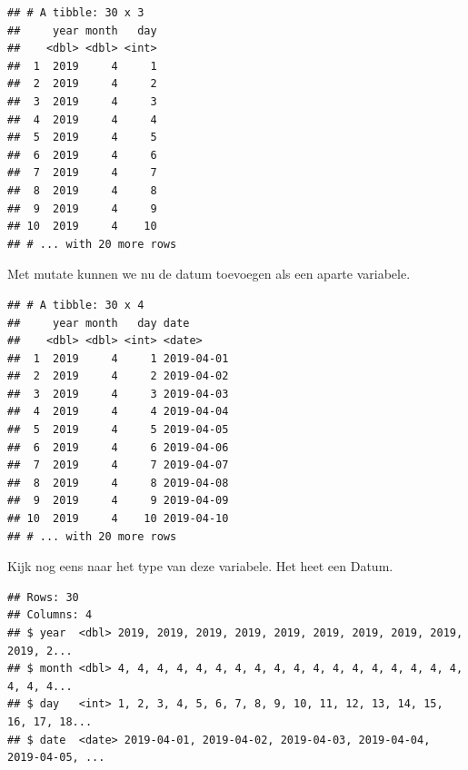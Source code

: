\documentclass[]{tufte-book}
\newenvironment{Shaded}{}{}
\newcommand{\DataTypeTok}[1]{\textcolor[rgb]{0.56,0.13,0.00}{#1}}
\newcommand{\KeywordTok}[1]{\textcolor[rgb]{0.00,0.44,0.13}{\textbf{#1}}}
\newcommand{\NormalTok}[1]{#1}
\newcommand{\OperatorTok}[1]{\textcolor[rgb]{0.40,0.40,0.40}{#1}}
\newcommand{\StringTok}[1]{\textcolor[rgb]{0.25,0.44,0.63}{#1}}
\begin{document}
\begin{verbatim}
## # A tibble: 30 x 3
##     year month   day
##    <dbl> <dbl> <int>
##  1  2019     4     1
##  2  2019     4     2
##  3  2019     4     3
##  4  2019     4     4
##  5  2019     4     5
##  6  2019     4     6
##  7  2019     4     7
##  8  2019     4     8
##  9  2019     4     9
## 10  2019     4    10
## # ... with 20 more rows
\end{verbatim}

Met mutate kunnen we nu de datum toevoegen als een aparte variabele.

\begin{Shaded}
\end{Shaded}

\begin{verbatim}
## # A tibble: 30 x 4
##     year month   day date      
##    <dbl> <dbl> <int> <date>    
##  1  2019     4     1 2019-04-01
##  2  2019     4     2 2019-04-02
##  3  2019     4     3 2019-04-03
##  4  2019     4     4 2019-04-04
##  5  2019     4     5 2019-04-05
##  6  2019     4     6 2019-04-06
##  7  2019     4     7 2019-04-07
##  8  2019     4     8 2019-04-08
##  9  2019     4     9 2019-04-09
## 10  2019     4    10 2019-04-10
## # ... with 20 more rows
\end{verbatim}

Kijk nog eens naar het type van deze variabele. Het heet een Datum.

\begin{Shaded}
\end{Shaded}

\begin{verbatim}
## Rows: 30
## Columns: 4
## $ year  <dbl> 2019, 2019, 2019, 2019, 2019, 2019, 2019, 2019, 2019, 2019, 2...
## $ month <dbl> 4, 4, 4, 4, 4, 4, 4, 4, 4, 4, 4, 4, 4, 4, 4, 4, 4, 4, 4, 4, 4...
## $ day   <int> 1, 2, 3, 4, 5, 6, 7, 8, 9, 10, 11, 12, 13, 14, 15, 16, 17, 18...
## $ date  <date> 2019-04-01, 2019-04-02, 2019-04-03, 2019-04-04, 2019-04-05, ...
\end{verbatim}
\end{document}
